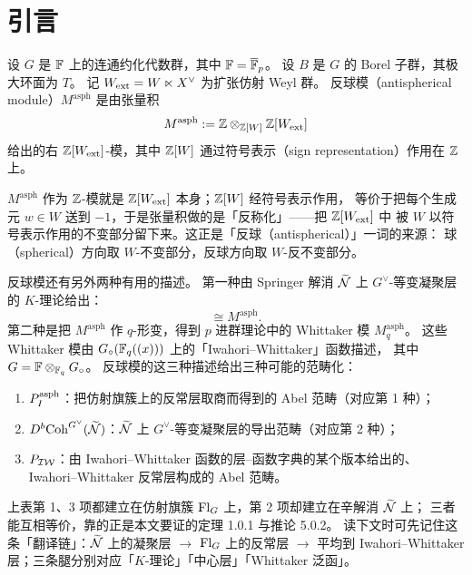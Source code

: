 \section{引言}

设 $G$ 是 $\mathbb{F}$ 上的连通约化代数群，其中 $\mathbb{F}=\overline{\mathbb{F}}_p$。
设 $B$ 是 $G$ 的 Borel 子群，其极大环面为 $T$。
记 $W_{\mathrm{ext}}=W\ltimes X^\vee$ 为扩张仿射 Weyl 群。
反球模（antispherical module）$M^{\mathrm{asph}}$ 是由张量积
\begin{equation}
M^{\mathrm{asph}} := \mathbb{Z}\otimes_{\mathbb{Z}[W]}\mathbb{Z}[W_{\mathrm{ext}}]
\end{equation}
给出的右 $\mathbb{Z}[W_{\mathrm{ext}}]$-模，其中 $\mathbb{Z}[W]$ 通过符号表示（sign representation）作用在 $\mathbb{Z}$ 上。

\begin{yizhu}
$M^{\mathrm{asph}}$ 作为 $\mathbb{Z}$-模就是 $\mathbb{Z}[W_{\mathrm{ext}}]$ 本身；$\mathbb{Z}[W]$ 经符号表示作用，
等价于把每个生成元 $w\in W$ 送到 $-1$，于是张量积做的是「反称化」——把 $\mathbb{Z}[W_{\mathrm{ext}}]$ 中
被 $W$ 以符号表示作用的不变部分留下来。这正是「反球（antispherical）」一词的来源：
球（spherical）方向取 $W$-不变部分，反球方向取 $W$-反不变部分。
\end{yizhu}

反球模还有另外两种有用的描述。
第一种由 Springer 解消 $\widetilde{\mathcal{N}}$ 上 $G^\vee$-等变凝聚层的 $K$-理论给出：
\begin{equation}
[D^b\Coh^{G^\vee}(\tN)]\cong M^{\mathrm{asph}}.
\end{equation}
第二种是把 $M^{\mathrm{asph}}$ 作 $q$-形变，得到 $p$ 进群理论中的 Whittaker 模 $M_q^{\mathrm{asph}}$。
这些 Whittaker 模由 $G_\circ(\mathbb{F}_q((x)))$ 上的「Iwahori–Whittaker」函数描述，
其中 $G=\mathbb{F}\otimes_{\mathbb{F}_q}G_\circ$。
反球模的这三种描述给出三种可能的范畴化：
\begin{enumerate}[label=(\arabic*),leftmargin=2.2em,itemsep=1pt]
\item $P_I^{\mathrm{asph}}$：把仿射旗簇上的反常层取商而得到的 Abel 范畴（对应第 1 种）；
\item $D^b\mathrm{Coh}^{G^\vee}(\widetilde{\mathcal{N}})$：$\widetilde{\mathcal{N}}$ 上 $G^\vee$-等变凝聚层的导出范畴（对应第 2 种）；
\item $P_{\mathcal{IW}}$：由 Iwahori–Whittaker 函数的层–函数字典的某个版本给出的、
      Iwahori–Whittaker 反常层构成的 Abel 范畴。
\end{enumerate}

\begin{yizhu}
上表第 1、3 项都建立在仿射旗簇 $\mathrm{Fl}_G$ 上，第 2 项却建立在辛解消 $\widetilde{\mathcal{N}}$ 上；
三者能互相等价，靠的正是本文要证的定理 1.0.1 与推论 5.0.2。
读下文时可先记住这条「翻译链」：$\widetilde{\mathcal{N}}$ 上的凝聚层 $\to$ $\mathrm{Fl}_G$ 上的反常层 $\to$ 平均到
Iwahori–Whittaker 层；三条腿分别对应「$K$-理论」「中心层」「Whittaker 泛函」。
\end{yizhu}

